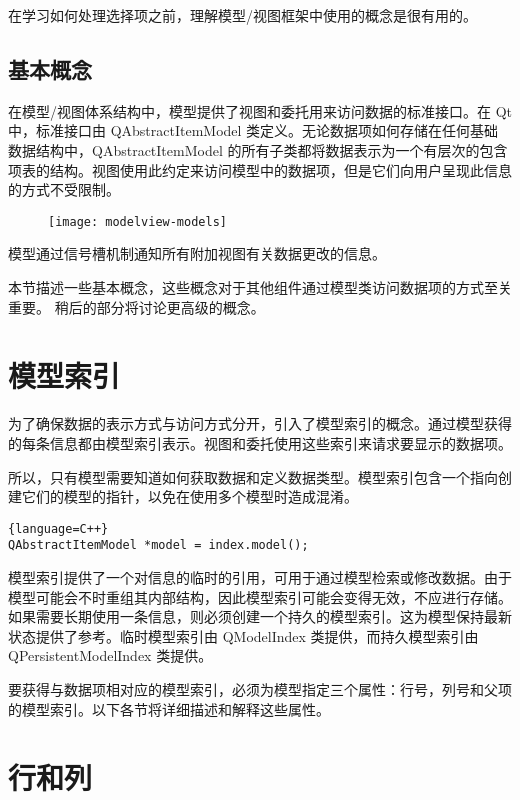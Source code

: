 在学习如何处理选择项之前，理解模型/视图框架中使用的概念是很有用的。

\subsection{基本概念}

在模型/视图体系结构中，模型提供了视图和委托用来访问数据的标准接口。在 Qt 中，标准接口由 QAbstractItemModel 类定义。无论数据项如何存储在任何基础数据结构中，QAbstractItemModel 的所有子类都将数据表示为一个有层次的包含项表的结构。视图使用此约定来访问模型中的数据项，但是它们向用户呈现此信息的方式不受限制。

\begin{figure}[hpt!]  
	\centering
    \texttt{[image: modelview-models]}
\end{figure}

模型通过信号槽机制通知所有附加视图有关数据更改的信息。

本节描述一些基本概念，这些概念对于其他组件通过模型类访问数据项的方式至关重要。 稍后的部分将讨论更高级的概念。

\section{模型索引}

为了确保数据的表示方式与访问方式分开，引入了模型索引的概念。通过模型获得的每条信息都由模型索引表示。视图和委托使用这些索引来请求要显示的数据项。

所以，只有模型需要知道如何获取数据和定义数据类型。模型索引包含一个指向创建它们的模型的指针，以免在使用多个模型时造成混淆。

\begin{lstlisting}{language=C++}
QAbstractItemModel *model = index.model();
\end{lstlisting}

模型索引提供了一个对信息的临时的引用，可用于通过模型检索或修改数据。由于模型可能会不时重组其内部结构，因此模型索引可能会变得无效，不应进行存储。如果需要长期使用一条信息，则必须创建一个持久的模型索引。这为模型保持最新状态提供了参考。临时模型索引由 QModelIndex 类提供，而持久模型索引由 QPersistentModelIndex 类提供。

要获得与数据项相对应的模型索引，必须为模型指定三个属性：行号，列号和父项的模型索引。以下各节将详细描述和解释这些属性。

\section{行和列}

